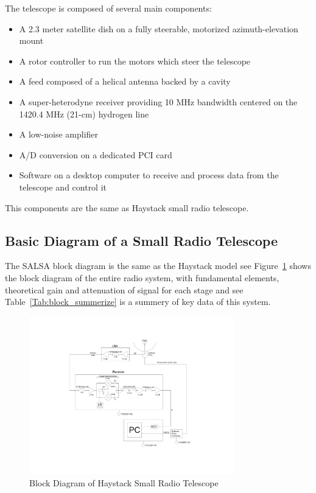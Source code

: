 \documentclass[10pt,conference]{IEEEtran}
\begin{document}
The telescope is composed of several main components:
\begin{itemize}
\item A 2.3 meter satellite dish on a fully steerable, motorized azimuth-elevation mount
\item A rotor controller to run the motors which steer the telescope
\item A feed composed of a helical antenna backed by a cavity
\item A super-heterodyne receiver providing 10 MHz bandwidth centered on the 1420.4 MHz (21-cm) hydrogen line
\item A low-noise amplifier
\item A/D conversion on a dedicated PCI card
\item Software on a desktop computer to receive and process data from the telescope and control it
\end{itemize}

This components are the same as Haystack small radio telescope\cite{DustinJohnson2012}.

\IEEEpubidadjcol

\subsection{Basic Diagram of a Small Radio Telescope}

The SALSA block diagram is the same as the Haystack model see Figure~\ref{fig:block_figure} shows the block diagram of the entire radio system, with fundamental elements, theoretical gain and attenuation of signal for each stage and see Table~\ref{Tab:block_summerize} is a summery of key data of this system\cite{DustinJohnson2012}.

\begin{figure}[htbp]
\centerline{\includegraphics[width=3.5in]{block.pdf}}
\caption{Block Diagram of Haystack Small Radio Telescope}
\label{fig:block_figure}
\end{figure}
\end{document}
